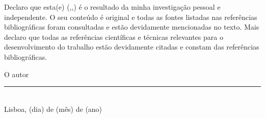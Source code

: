 \makeatletter
Declaro que esta(e) \MakeLowercase{\thedoctypestr(\iselthesis@opt@docdegree,\iselthesis@opt@doctype,\iselthesis@opt@coverlang)} é o resultado da minha investigação pessoal e independente. O seu conteúdo é original e todas as fontes listadas nas referências bibliográficas foram consultadas e estão devidamente mencionadas no texto. Mais declaro que todas as referências científicas e técnicas relevantes para o desenvolvimento do trabalho estão devidamente citadas e constam das referências bibliográficas.
\makeatother
\begin{center}
O autor
\\[3em]

\rule{.5\textwidth}{1pt}
\\[.5em]
\fontsize{10}{12.2}
\selectfont
Lisboa, (dia) de (mês) de (ano)
\end{center}

